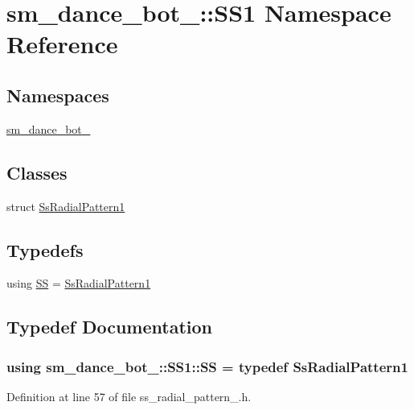 \hypertarget{namespacesm__dance__bot__2_1_1SS1}{}\section{sm\+\_\+dance\+\_\+bot\+\_\+:\+:S\+S1 Namespace Reference}
\label{namespacesm__dance__bot__2_1_1SS1}
\subsection*{Namespaces}
\begin{DoxyCompactItemize}
\item 
 \hyperlink{namespacesm__dance__bot__2_1_1SS1_1_1sm__dance__bot__2}{sm\+\_\+dance\+\_\+bot\+\_}
\end{DoxyCompactItemize}
\subsection*{Classes}
\begin{DoxyCompactItemize}
\item 
struct \hyperlink{structsm__dance__bot__2_1_1SS1_1_1SsRadialPattern1}{Ss\+Radial\+Pattern1}
\end{DoxyCompactItemize}
\subsection*{Typedefs}
\begin{DoxyCompactItemize}
\item 
using \hyperlink{namespacesm__dance__bot__2_1_1SS1_a01643449f4dda719d7f3a47d09453ed0}{SS} = \hyperlink{structsm__dance__bot__2_1_1SS1_1_1SsRadialPattern1}{Ss\+Radial\+Pattern1}
\end{DoxyCompactItemize}


\subsection{Typedef Documentation}
\subsubsection[{\texorpdfstring{SS}{SS}}]{\setlength{\rightskip}{0pt plus 5cm}using {\bf sm\+\_\+dance\+\_\+bot\+\_\+::\+S\+S1\+::\+SS} = typedef {\bf Ss\+Radial\+Pattern1}}\hypertarget{namespacesm__dance__bot__2_1_1SS1_a01643449f4dda719d7f3a47d09453ed0}{}\label{namespacesm__dance__bot__2_1_1SS1_a01643449f4dda719d7f3a47d09453ed0}


Definition at line 57 of file ss\+\_\+radial\+\_\+pattern\+\_.\+h.

